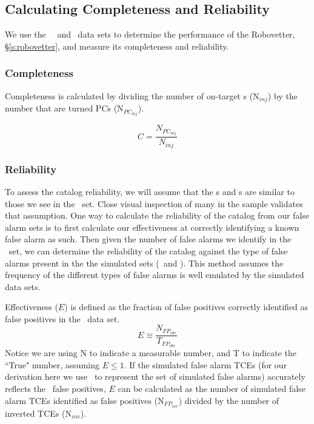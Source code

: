 

\newcommand{\opsfp}{N$_{FP_{obs}}$}
\newcommand{\opspc}{N$_{PC_{obs}}$}
\newcommand{\opsN}{N$_{obs}$}
\newcommand{\trueopspc}{T$_{PC_{obs}}$}
\newcommand{\missedfp}{T$_{FP_{obs}}$ - N$_{FP_{obs}}$}
\newcommand{\invfp}{N$_{FP_{inv}}$}
\newcommand{\invpc}{N$_{PC_{inv}}$}
\newcommand{\invN}{N$_{inv}$}
\newcommand{\sfatce}{SFA-TCE}


\subsection{Calculating Completeness and Reliability}
We use the \injtce\, \scrtce\ and \invtce\ data sets to determine the performance of the Robovetter, \S\ref{s:robovetter}, and measure its completeness and reliability.

\subsubsection{Completeness}
Completeness is calculated by dividing the number of on-target \injtce s (N$_{inj}$) by the number that are turned PCs (N$_{PC_{inj}}$). 

\begin{equation}
\label{comp}
C = \frac{N_{PC_{inj}}}{N_{inj}}
\end{equation}



\subsubsection{Reliability}
\label{s:relcalc}
To assess the catalog reliability, we will assume that the \scrtce s and \invtce s are similar to those we see in the \opstce\ set. Close visual inspection of many in the sample validates that assumption.  One way to calculate the reliability of the catalog from our false alarm sets is to first calculate our effectiveness at correctly identifying a known false alarm as such.  Then given the number of false alarms we identify in the \opstce\ set, we can determine the reliability of the catalog against the type of false alarms present in the the simulated sets (\invtce\ and \scrtce). This method assumes the frequency of the different types of false alarms is well emulated by the simulated data sets. 


Effectiveness ($E$) is defined as the fraction of false positives correctly identified as false positives in the \opstce\ data set. 
\begin{equation}
\label{effect1}
E \equiv \frac{N_{FP_{obs}}}{T_{FP_{obs}}}
\end{equation}
Notice we are using N to indicate a measurable number, and T to indicate the ``True" number, assuming $E\leq 1 $.  If the simulated false alarm TCEs (for our derivation here we use \invtce\ to represent the set of simulated false alarms) accurately reflects the \opstce\ false positives, $E$ can be calculated as the number of simulated false alarm TCEs identified as false positives (\invfp) divided by the number of inverted TCEs (\invN). 


